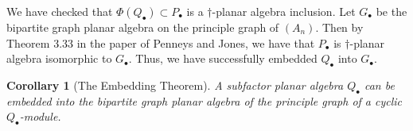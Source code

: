 \documentclass[11pt]{article}
\theoremstyle{plain}
\newtheorem{cor}[thm]{Corollary}
\theoremstyle{definition}
\begin{document}
We have checked that $\Phi(Q_{\bullet}) \subset P_{\bullet}$ is a $\dagger$-planar algebra inclusion. Let $G_\bullet$ be the bipartite graph planar algebra on the principle graph of $(A_n)$. Then by Theorem 3.33 in the paper of Penneys and Jones, %
we have that $P_\bullet$ is $\dagger$-planar algebra isomorphic to $G_\bullet$. Thus, we have successfully embedded $Q_\bullet$ into $G_\bullet$.

\begin{cor}[The Embedding Theorem]
	A subfactor planar algebra $Q_\bullet$ can be embedded into the bipartite graph planar algebra of the principle graph of a cyclic $Q_\bullet$-module.
\end{cor}



\end{document}
